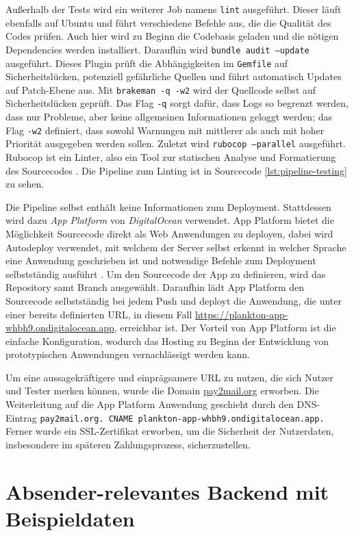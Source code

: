 Außerhalb der Tests wird ein weiterer Job namens \texttt{lint} ausgeführt. Dieser läuft ebenfalls auf Ubuntu und führt verschiedene Befehle aus, die die Qualität des Codes prüfen. Auch hier wird zu Beginn die Codebasis geladen und die nötigen Dependencies werden installiert. Daraufhin wird \texttt{bundle audit --update} ausgeführt. Dieses Plugin prüft die Abhängigkeiten im \texttt{Gemfile} auf Sicherheitslücken, potenziell gefährliche Quellen und führt automatisch Updates auf Patch-Ebene aus. Mit \texttt{brakeman -q -w2} wird der Quellcode selbst auf Sicherheitslücken geprüft. Das Flag \texttt{-q} sorgt dafür, dass Logs so begrenzt werden, dass nur Probleme, aber keine allgemeinen Informationen geloggt werden; das Flag \texttt{-w2} definiert, dass sowohl Warnungen mit mittlerer als auch mit hoher Priorität ausgegeben werden sollen. Zuletzt wird \texttt{rubocop --parallel} ausgeführt. Rubocop ist ein Linter, also ein Tool zur statischen Analyse und Formatierung des Sourcecodes \citep{Batsov2022}. Die Pipeline zum Linting ist in Sourcecode \ref{lst:pipeline-testing} zu sehen.

Die Pipeline selbst enthält keine Informationen zum Deployment. Stattdessen wird dazu \textit{App Platform} von \textit{DigitalOcean} verwendet. App Platform bietet die Möglichkeit Sourcecode direkt als Web Anwendungen zu deployen, dabei wird Autodeploy verwendet, mit welchem der Server selbst erkennt in welcher Sprache eine Anwendung geschrieben ist und notwendige Befehle zum Deployment selbstständig ausführt \citep{DigitalOcean2022}. Um den Sourcecode der App zu definieren, wird das Repository samt Branch ausgewählt. Daraufhin lädt App Platform den Sourcecode selbstständig bei jedem Push und deployt die Anwendung, die unter einer bereits definierten URL, in diesem Fall \url{https://plankton-app-whbh9.ondigitalocean.app}, erreichbar ist. Der Vorteil von App Platform ist die einfache Konfiguration, wodurch das Hosting zu Beginn der Entwicklung von prototypischen Anwendungen vernachlässigt werden kann.

Um eine aussagekräftigere und einprägsamere URL zu nutzen, die sich Nutzer und Tester merken können, wurde die Domain \url{pay2mail.org} erworben. Die Weiterleitung auf die App Platform Anwendung geschieht durch den DNS-Eintrag \texttt{pay2mail.org. CNAME plankton-app-whbh9.ondigitalocean.app.} Ferner wurde ein SSL-Zertifikat erworben, um die Sicherheit der Nutzerdaten, insbesondere im späteren Zahlungsprozess, sicherzustellen.

\section{Absender-relevantes Backend mit Beispieldaten}
\label{Absender-relevantes_Backend_mit_Beispieldaten}

